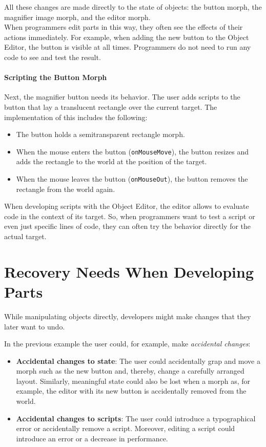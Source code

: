 All these changes are made directly to the state of objects: the button morph, the magnifier image morph, and the editor morph.\\
When programmers edit parts in this way, they often see the effects of their actions immediately.
For example, when adding the new button to the Object Editor, the button is visible at all times.
Programmers do not need to run any code to see and test the result.

\paragraph{Scripting the Button Morph}
Next, the magnifier button needs its behavior.
The user adds scripts to the button that lay a translucent rectangle over the current target.
The implementation of this includes the following: 
\begin{itemize}
    \item The button holds a semitransparent rectangle morph.
    \item When the mouse enters the button (\lstinline{onMouseMove}), the button resizes and adds the rectangle to the world at the position of the target.
    \item When the mouse leaves the button (\lstinline{onMouseOut}), the button removes the rectangle from the world again.
\end{itemize}
 
When developing scripts with the Object Editor, the editor allows to evaluate code in the context of its target.
So, when programmers want to test a script or even just specific lines of code, they can often try the behavior directly for the actual target.


\section{Recovery Needs When Developing Parts}

While manipulating objects directly, developers might make changes that they later want to undo.

In the previous example the user could, for example, make \emph{accidental changes}:

\begin{itemize}
    \item \textbf{Accidental changes to state}: The user could accidentally grap and move a morph such as the new button and, thereby, change a carefully arranged layout. Similarly, meaningful state could also be lost when a morph as, for example, the editor with its new button is accidentally removed from the world.
    \item \textbf{Accidental changes to scripts}: The user could introduce a typographical error or accidentally remove a script. Moreover, editing a script could introduce an error or a decrease in performance.
\end{itemize}

